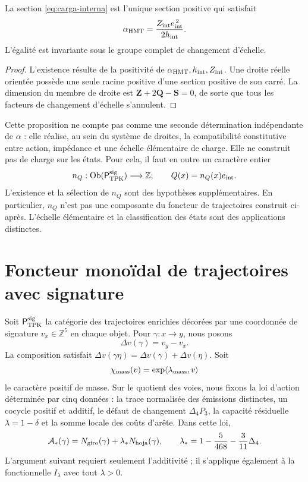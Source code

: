 \begin{proposition}
La section \eqref{eq:carga-interna} est l'unique section positive qui
satisfait
\[
 \alpha_{\rm HMT}
 =\frac{Z_{\rm int}e_{\rm int}^{\,2}}{2h_{\rm int}}.
\]
L'égalité est invariante sous le groupe complet de changement d'échelle.
\end{proposition}

\begin{proof}
L'existence résulte de la positivité de
\(\alpha_{\rm HMT},h_{\rm int},Z_{\rm int}\). Une droite réelle orientée
possède une seule racine positive d'une section positive de son carré. La
dimension du membre de droite est
\(\mathbf Z+2\mathbf Q-\mathbf S=0\), de sorte que tous les facteurs de
changement d'échelle s'annulent.
\end{proof}

Cette proposition ne compte pas comme une seconde détermination indépendante de
\(\alpha\) : elle réalise, au sein du système de droites, la compatibilité
constitutive entre action, impédance et une échelle élémentaire de charge. Elle ne
construit pas de charge sur les états. Pour cela, il faut en outre un
caractère entier
\[
 n_Q:\operatorname{Ob}(\mathsf P_{\rm TPK}^{\rm sig})\longrightarrow
 \mathbb Z;
 \qquad
 Q(x)=n_Q(x)e_{\rm int}.
\]
L'existence et la sélection de \(n_Q\) sont des hypothèses supplémentaires. En
particulier, \(n_Q\) n'est pas une composante du foncteur de trajectoires
construit ci-après. L'échelle élémentaire et la classification des états
sont des applications distinctes.

\section{Foncteur monoïdal de trajectoires avec signature}

Soit \(\mathsf P_{\rm TPK}^{\rm sig}\) la catégorie des trajectoires
enrichies décorées par une coordonnée de signature
\(v_x\in\mathbb Z^5\) en chaque objet. Pour
\(\gamma:x\to y\), nous posons
\[
 \Delta v(\gamma)=v_y-v_x.
\]
La composition satisfait
\(\Delta v(\gamma\eta)=\Delta v(\gamma)+\Delta v(\eta)\).
Soit
\[
 \chi_{\rm mass}(v)=\exp\langle\lambda_{\rm mass},v\rangle
\]
le caractère positif de masse. Sur le quotient des voies, nous fixons la loi
d'action déterminée par cinq données : la trace normalisée des émissions
distinctes, un cocycle positif et additif, le défaut de changement
\(\Delta_4P_3\), la capacité résiduelle \(\lambda=1-\delta\) et la somme locale
des coûts d'arête. Dans cette loi,
\[
 \mathcal A_*(\gamma)
 =N_{\rm giro}(\gamma)+\lambda_*N_{\rm hoja}(\gamma),
 \qquad
 \lambda_*=1-\frac5{468}-\frac3{11}\Delta_4.
\]
L'argument suivant requiert seulement l'additivité ; il s'applique également à la
fonctionnelle \(I_\lambda\) avec tout \(\lambda>0\).

